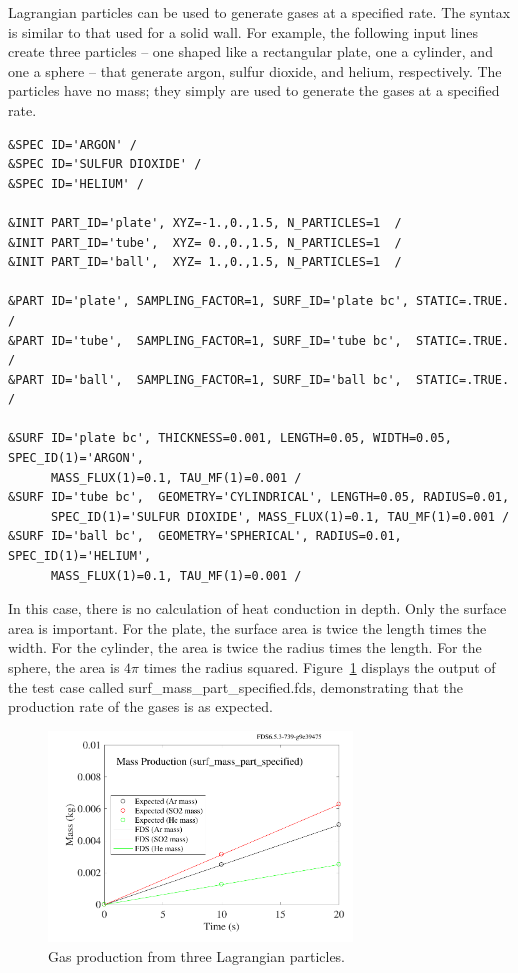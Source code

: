 \documentclass[11pt]{book}
\begin{document}
Lagrangian particles can be used to generate gases at a specified rate. The syntax is similar to that used for a solid wall. For example, the following input lines create three particles -- one shaped like a rectangular plate, one a cylinder, and one a sphere -- that generate argon, sulfur dioxide, and helium, respectively. The particles have no mass; they simply are used to generate the gases at a specified rate.

\begin{lstlisting}
&SPEC ID='ARGON' /
&SPEC ID='SULFUR DIOXIDE' /
&SPEC ID='HELIUM' /

&INIT PART_ID='plate', XYZ=-1.,0.,1.5, N_PARTICLES=1  /
&INIT PART_ID='tube',  XYZ= 0.,0.,1.5, N_PARTICLES=1  /
&INIT PART_ID='ball',  XYZ= 1.,0.,1.5, N_PARTICLES=1  /

&PART ID='plate', SAMPLING_FACTOR=1, SURF_ID='plate bc', STATIC=.TRUE. /
&PART ID='tube',  SAMPLING_FACTOR=1, SURF_ID='tube bc',  STATIC=.TRUE. /
&PART ID='ball',  SAMPLING_FACTOR=1, SURF_ID='ball bc',  STATIC=.TRUE. /

&SURF ID='plate bc', THICKNESS=0.001, LENGTH=0.05, WIDTH=0.05, SPEC_ID(1)='ARGON',
      MASS_FLUX(1)=0.1, TAU_MF(1)=0.001 /
&SURF ID='tube bc',  GEOMETRY='CYLINDRICAL', LENGTH=0.05, RADIUS=0.01,
      SPEC_ID(1)='SULFUR DIOXIDE', MASS_FLUX(1)=0.1, TAU_MF(1)=0.001 /
&SURF ID='ball bc',  GEOMETRY='SPHERICAL', RADIUS=0.01, SPEC_ID(1)='HELIUM',
      MASS_FLUX(1)=0.1, TAU_MF(1)=0.001 /
\end{lstlisting}

\noindent In this case, there is no calculation of heat conduction in depth. Only the surface area is important. For the plate, the surface area is twice the length times the width. For the cylinder, the area is twice the radius times the length. For the sphere, the area is $4\pi$ times the radius squared. Figure~\ref{surf_mass_part_specified} displays the output of the test case called {\ct surf\_mass\_part\_specified.fds}, demonstrating that the production rate of the gases is as expected.

\begin{figure}[ht]
\begin{center}
\includegraphics[height=2.2in]{SCRIPT_FIGURES/surf_mass_part_specified}
\end{center}
\caption[Example of specified gas mass production from particles]{Gas production from three Lagrangian particles.}
\label{surf_mass_part_specified}
\end{figure}
\end{document}
